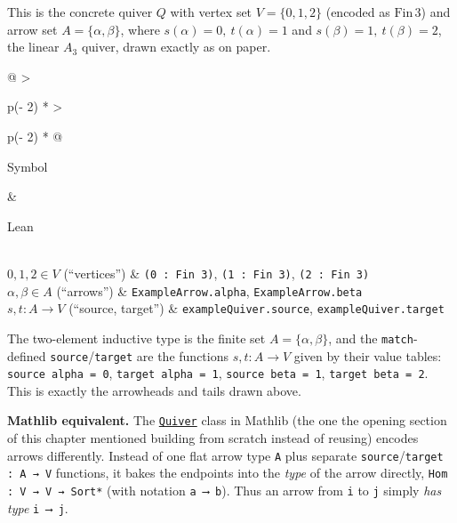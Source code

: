 \begin{mathreading}

This is the concrete quiver \(Q\) with vertex set \(V = \{0,1,2\}\) (encoded as \(\mathrm{Fin}\,3\)) and arrow set \(A = \{\alpha, \beta\}\), where \(s(\alpha)=0,\ t(\alpha)=1\) and \(s(\beta)=1,\
t(\beta)=2\), the linear \(A_3\) quiver, drawn exactly as on paper.

\end{mathreading}

\begin{center}

\end{center}

\begin{longtable}[]{@{}
  >{\raggedright\arraybackslash}p{(\columnwidth - 2\tabcolsep) * }
  >{\raggedright\arraybackslash}p{(\columnwidth - 2\tabcolsep) * \real{0.5000}}@{}}
\toprule\noalign{}
\begin{minipage}[b]{\linewidth}\raggedright
Symbol
\end{minipage} & \begin{minipage}[b]{\linewidth}\raggedright
Lean
\end{minipage} \\
\midrule\noalign{}
\endhead
\bottomrule\noalign{}
\endlastfoot
\(0, 1, 2 \in V\) (``vertices'') & \texttt{(0 : Fin 3)}, \texttt{(1 : Fin 3)}, \texttt{(2 : Fin 3)} \\
\(\alpha, \beta \in A\) (``arrows'') & \texttt{ExampleArrow.alpha}, \texttt{ExampleArrow.beta} \\
\(s, t : A \to V\) (``source, target'') & \texttt{exampleQuiver.source}, \texttt{exampleQuiver.target} \\
\end{longtable}

The two-element inductive type is the finite set \(A = \{\alpha,\beta\}\), and the \texttt{match}-defined \texttt{source}/\texttt{target} are the functions \(s, t : A \to V\) given by their value tables: \texttt{source alpha = 0}, \texttt{target alpha = 1}, \texttt{source beta = 1}, \texttt{target beta = 2}. This is exactly the arrowheads and tails drawn above.

\textbf{Mathlib equivalent.} The \href{https://loogle.lean-lang.org/?q=Quiver}{\texttt{Quiver}} class in Mathlib (the one the opening section of this chapter mentioned building from scratch instead of reusing) encodes arrows differently. Instead of one flat arrow type \texttt{A} plus separate \texttt{source}/\texttt{target : A → V} functions, it bakes the endpoints into the \emph{type} of the arrow directly, \texttt{Hom : V → V → Sort*} (with notation \texttt{a ⟶ b}). Thus an arrow from \texttt{i} to \texttt{j} simply \emph{has type} \texttt{i ⟶ j}.

